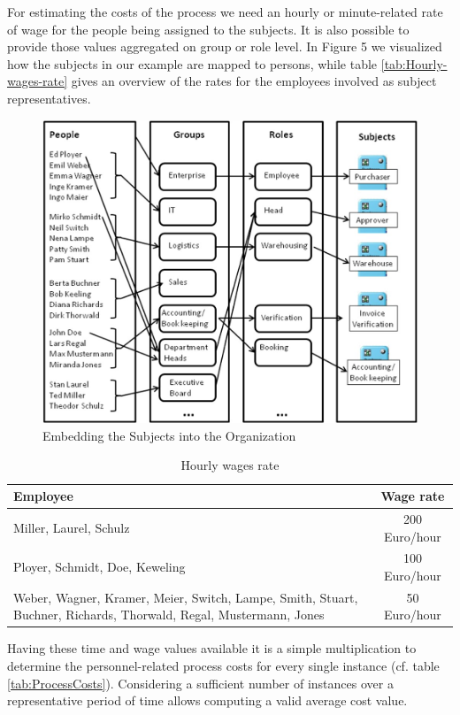 For estimating the costs of the process we need an hourly or minute-related rate of wage for the people being assigned to the subjects. It is also possible to provide those values aggregated on group or role level. In Figure 5 we visualized how the subjects in our example are mapped to persons, while table \ref{tab:Hourly-wages-rate} gives an overview of the rates for the employees involved as subject representatives.

\begin{figure}[htbp]
	\centering
	\includegraphics[width=0.6\linewidth] {Figures/Chapter5/ActivityBased/embedding.jpg}
	\caption[Embedding the Subjects into the Organization]{Embedding the Subjects into the Organization}
	\label{fig:Embedding}
\end{figure}

\begin{table}[htbp]
	\centering
	\begin{tabular}{|p{10.0 cm } |c|}
		\hline
		\textbf{Employee} & \textbf{Wage rate} \\
		\hline
		\hline
		Miller, Laurel, Schulz & 200 Euro/hour\\
		\hline
		Ployer, Schmidt, Doe, Keweling & 100 Euro/hour\\
		\hline
		Weber, Wagner, Kramer, Meier, Switch, Lampe, Smith, Stuart, Buchner, Richards, Thorwald, Regal, Mustermann, Jones & 50 Euro/hour\\
		\hline
	\end{tabular}
\label{tab:HourlyWages}
\caption{Hourly wages rate}
\end{table}



Having these time and wage values available it is a simple multiplication to determine the personnel-related process costs for every single instance (cf. table \ref{tab:ProcessCosts}). Considering a sufficient number of instances over a representative period of time allows computing a valid average cost value.


